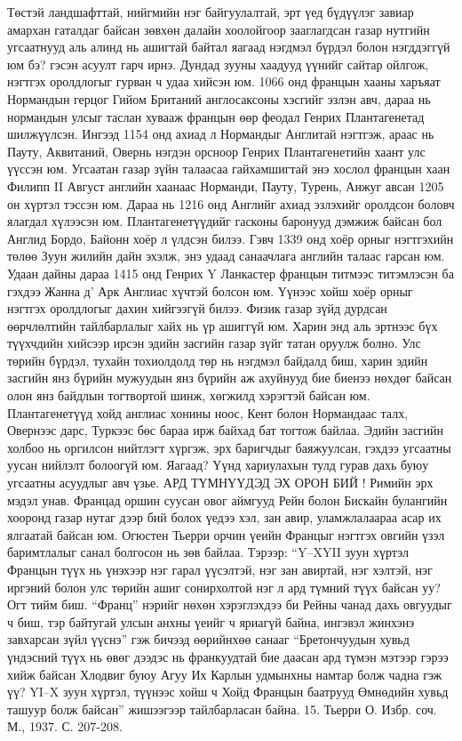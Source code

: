Төстэй ландшафттай, нийгмийн нэг байгуулалтай, эрт үед бүдүүлэг завиар амархан гаталдаг байсан зөвхөн далайн хоолойгоор зааглагдсан газар нутгийн угсаатнууд аль алинд нь ашигтай байтал яагаад нэгдмэл бүрдэл болон нэгддэггүй юм бэ? гэсэн асуулт гарч ирнэ. Дундад зууны хаадууд үүнийг сайтар ойлгож, нэгтгэх оролдлогыг гурван ч удаа хийсэн юм. 1066 онд францын хааны харъяат Нормандын герцог Гийом Британий англосаксоны хэсгийг эзлэн авч, дараа нь нормандын улсыг таслан хувааж францын өөр феодал Генрих Плантагенетад шилжүүлсэн. Ингээд 1154 онд ахиад л Нормандыг Англитай нэгтгэж, араас нь Пауту, Аквитаний, Овернь нэгдэн орсноор Генрих Плантагенетийн хаант улс үүссэн юм. Угсаатан газар зүйн талаасаа гайхамшигтай энэ хослол францын хаан Филипп II Август английн хаанаас Норманди, Пауту, Турень, Анжуг авсан 1205 он хүртэл тэссэн юм. Дараа нь 1216 онд Английг ахиад эзлэхийг оролдсон боловч ялагдал хүлээсэн юм. Плантагенетүүдийг гасконы баронууд дэмжиж байсан бол Англид Бордо, Байонн хоёр л үлдсэн билээ. Гэвч 1339 онд хоёр орныг нэгтгэхийн төлөө Зуун жилийн дайн эхэлж, энэ удаад санаачлага английн талаас гарсан юм. Удаан дайны дараа 1415 онд Генрих Y Ланкастер францын титмээс титэмлэсэн ба гэхдээ Жанна д’ Арк Англиас хүчтэй болсон юм. Үүнээс хойш хоёр орныг нэгтгэх оролдлогыг дахин хийгээгүй билээ.
Физик газар зүйд дурдсан өөрчлөлтийн тайлбарлалыг хайх нь үр ашиггүй юм. Харин энд аль эртнээс бүх түүхчдийн хийсээр ирсэн эдийн засгийн газар зүйг татан оруулж болно. Улс төрийн бүрдэл, тухайн тохиолдолд төр нь нэгдмэл байдалд биш, харин эдийн засгийн янз бүрийн мужуудын янз бүрийн аж ахуйнууд бие биенээ нөхдөг байсан олон янз байдлын тогтвортой шинж, хөгжилд хэрэгтэй байсан юм. Плантагенетүүд хойд англиас хонины ноос, Кент болон Нормандаас талх, Овернээс дарс, Туркээс бөс бараа ирж байхад бат тогтож байлаа. Эдийн засгийн холбоо нь оргилсон нийтлэгт хүргэж, эрх баригчдыг баяжуулсан, гэхдээ угсаатны уусан нийлэлт болоогүй юм. Яагаад? Үүнд хариулахын тулд гурав дахь буюу угсаатны асуудлыг авч үзье.
АРД ТҮМНҮҮДЭД ЭХ ОРОН БИЙ !
Римийн эрх мэдэл унав. Францад оршин суусан овог аймгууд Рейн болон Бискайн булангийн хооронд газар нутаг дээр бий болох үедээ хэл, зан авир, уламжлалаараа асар их ялгаатай байсан юм. Огюстен Тьерри орчин үеийн Францыг нэгтгэх овгийн үзэл баримтлалыг санал болгосон нь зөв байлаа. Тэрээр: “Y–XYII зуун хүртэл Францын түүх нь үнэхээр нэг гарал үүсэлтэй, нэг зан авиртай, нэг хэлтэй, нэг иргэний болон улс төрийн ашиг сонирхолтой нэг л ард түмний түүх байсан уу? Огт тийм биш. “Франц” нэрийг нөхөн хэрэглэхдээ би Рейны чанад дахь овгуудыг ч биш, тэр байтугай улсын анхны үеийг ч яриагүй байна, ингэвэл жинхэнэ завхарсан зүйл үүснэ” гэж бичээд өөрийнхөө санааг “Бретончуудын хувьд үндэсний түүх нь өвөг дээдэс нь франкуудтай бие даасан ард түмэн мэтээр гэрээ хийж байсан Хлодвиг буюу Агуу Их Карлын удмынхны намтар болж чадна гэж үү? YI–X зуун хүртэл, түүнээс хойш ч Хойд Францын баатрууд Өмнөдийн хувьд ташуур болж байсан” жишээгээр тайлбарласан байна. 15. Тьерри О. Избр. соч. М., 1937. С. 207-208.
